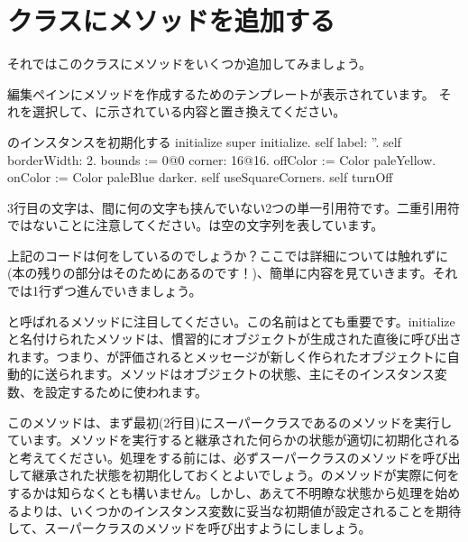\documentclass[a4paper,10pt,twoside]{book}
\begin{document}
\section{クラスにメソッドを追加する}

それではこのクラスにメソッドをいくつか追加してみましょう。


編集ペインにメソッドを作成するためのテンプレートが表示されています。
それを選択して、に示されている内容と置き換えてください。


\begin{numMethod}[scbecellinitialize]{のインスタンスを初期化する}
initialize
   super initialize.
   self label: ''.
   self borderWidth: 2.
   bounds := 0@0 corner: 16@16.
   offColor := Color paleYellow.
   onColor := Color paleBlue darker.
   self useSquareCorners.
   self turnOff
\end{numMethod}

\noindent
3行目の文字は、間に何の文字も挟んでいない2つの単一引用符です。二重引用符ではないことに注意してください。は空の文字列を表しています。


上記のコードは何をしているのでしょうか？ここでは詳細については触れずに(本の残りの部分はそのためにあるのです！)、簡単に内容を見ていきます。それでは1行ずつ進んでいきましょう。

と呼ばれるメソッドに注目してください。この名前はとても重要です。initializeと名付けられたメソッドは、慣習的にオブジェクトが生成された直後に呼び出されます。つまり、が評価されるとメッセージが新しく作られたオブジェクトに自動的に送られます。メソッドはオブジェクトの状態、主にそのインスタンス変数、を設定するために使われます。

このメソッドは、まず最初(2行目)にスーパークラスであるのメソッドを実行しています。メソッドを実行すると継承された何らかの状態が適切に初期化されると考えてください。処理をする前には、必ずスーパークラスのメソッドを呼び出して継承された状態を初期化しておくとよいでしょう。のメソッドが実際に何をするかは知らなくとも構いません。しかし、あえて不明瞭な状態から処理を始めるよりは、いくつかのインスタンス変数に妥当な初期値が設定されることを期待して、スーパークラスのメソッドを呼び出すようにしましょう。
\end{document}
